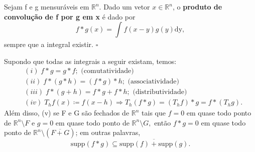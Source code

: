 \documentclass[../distribution_theory_notes.tex]{subfiles}
\begin{document}
  \begin{def*}
    Sejam f e g mensuráveis em \(\mathbb{R}^{n}\). Dado um vetor \(x\in \mathbb{R}^{n}\), o \textbf{produto de convolução de f por g em x} é dado por 
      \[
        f*g(x)=\int_{}^{}f(x-y)g(y) \mathrm{dy},
      \]
      sempre que a integral existir. \(\square\)
  \end{def*}
 \begin{lemma*}
   Supondo que todas as integrais a seguir existam, temos: 
  \begin{align*}
    &(i)\;f*g = g*f; \text{ (comutatividade)} \\
    &(ii)\;f*(g*h) = (f*g)*h; \text{ (associatividade)}\\
    &(iii)\;f*(g+h) = f*g + f*h; \text{ (distributividade)}\\
    &(iv)\; T_hf(x)\coloneqq f(x-h) \Rightarrow T_h(f*g)=(T_hf)*g=f*(T_hg).
  \end{align*}
  Além disso, (v) se F e G são fechados de \(\mathbb{R}^{n}\) tais que \(f=0\) em quase todo ponto de \(\mathbb{R}^{n}\setminus{F}\) e \(g=0\) em quase todo ponto de \(\mathbb{R}^{n}\setminus{G},\) então \(f*g=0\) em quase todo ponto de \(\mathbb{R}^{n}\setminus{(\overline{F+G})}\); em outras palavras, 
    \[
      \mathrm{supp}(f*g)\subseteq \overline{\mathrm{supp}(f)+\mathrm{supp}(g)}.
    \]
 \end{lemma*}
\end{document}
